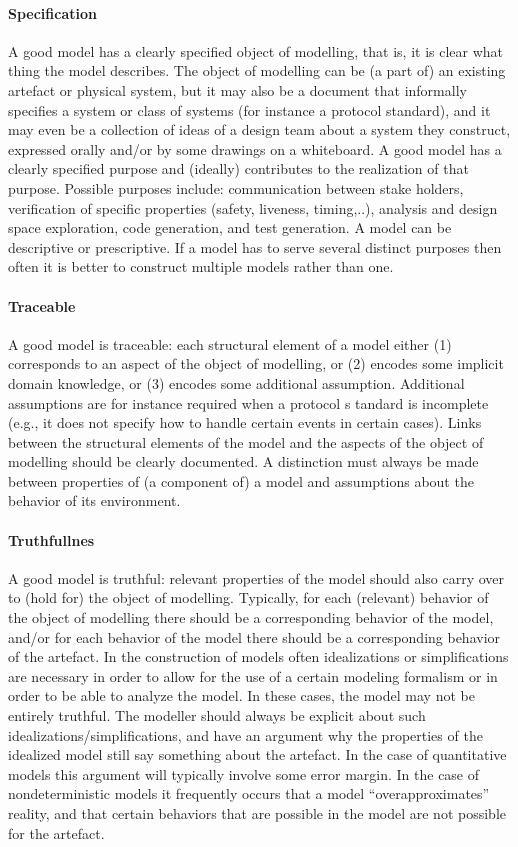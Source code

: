\paragraph{Specification}
A good model has a clearly specified object of modelling, that is, it is clear what thing the model describes. The object of modelling can be (a part of) an existing artefact or physical system, but it may also be a document that informally specifies a system or class of systems (for instance a protocol standard), and it may even be a collection of ideas of a design team about a system they construct, expressed orally and/or by some drawings on a whiteboard.
A good model has a clearly specified purpose and (ideally) contributes to the realization of that purpose. Possible purposes include: communication between stake holders, verification of specific properties (safety, liveness, timing,..), analysis and design space exploration, code generation, and test generation. A model can be descriptive or prescriptive. If a model has to serve several distinct purposes then often it is better to construct multiple models rather than one.
\paragraph{Traceable}
A good model is traceable: each structural element of a model either (1) corresponds to an aspect of the object of modelling, or (2) encodes some implicit domain knowledge, or (3) encodes some additional assumption. Additional assumptions are for instance required when a protocol s tandard is incomplete (e.g., it does not specify how to handle certain events in certain cases). Links between the structural elements of the model and the aspects of the object of modelling should be clearly documented. A distinction must always be made between properties of (a component of) a model and assumptions about the behavior of its environment.
\paragraph{Truthfullnes}
A good model is truthful: relevant properties of the model should also carry over to (hold for) the object of modelling. Typically, for each (relevant) behavior of the object of modelling there should be a corresponding behavior of the model, and/or for each behavior of the model there should be a corresponding behavior of the artefact. In the construction of models often idealizations or simplifications are necessary in order to allow for the use of a certain modeling formalism or in order to be able to analyze the model. In these cases, the model may not be entirely truthful. The modeller should always be explicit about such idealizations/simplifications, and have an argument why the properties of the idealized model still say something about the artefact. In the case of quantitative models this argument will typically involve some error margin. In the case of nondeterministic models it frequently occurs that a model ``overapproximates'' reality, and that certain behaviors that are possible in the model are not possible for the artefact.
